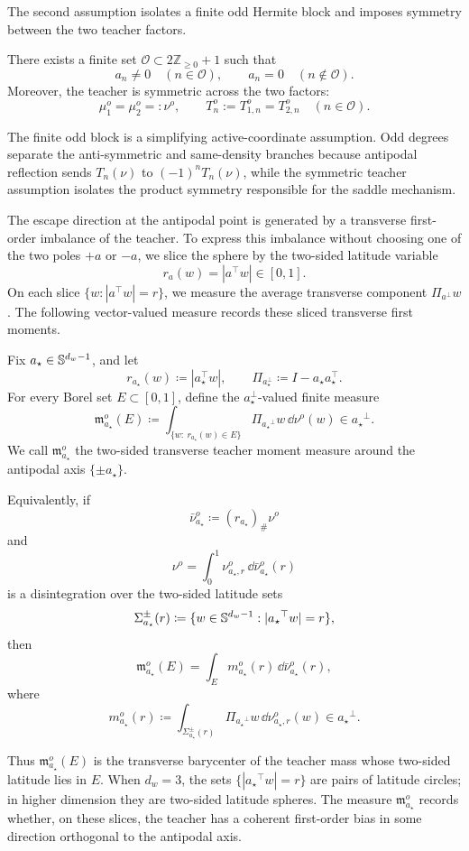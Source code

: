 The second assumption isolates a finite odd Hermite block and imposes symmetry between the two teacher factors.
\begin{assumption}
\label{assumption:odd-symmetric-teacher}
There exists a finite set \(\mathcal O\subset 2\mathbb Z_{\ge0}+1\) such that
\[
    a_n\neq0 \quad (n\in\mathcal O),
    \qquad
    a_n=0 \quad (n\notin\mathcal O).
\]
Moreover, the teacher is symmetric across the two factors:
\[
    \mu_1^o=\mu_2^o=:\nu^o,
    \qquad
    T_n^o:=T_{1,n}^o=T_{2,n}^o
    \quad(n\in\mathcal O).
\]
\end{assumption}
The finite odd block is a simplifying active-coordinate assumption.  Odd degrees
separate the anti-symmetric and same-density branches because antipodal
reflection sends \(T_n(\nu)\) to \((-1)^nT_n(\nu)\), while the symmetric teacher
assumption isolates the product symmetry responsible for the saddle mechanism.

The escape direction at the antipodal point is generated by a transverse first-order imbalance of the teacher.  To express this imbalance without
choosing one of the two poles \(+a\) or \(-a\), we slice the sphere by the
two-sided latitude variable
\[
    r_a(w)=|a^\top w|\in[0,1].
\]
On each slice \(\{w:|a^\top w|=r\}\), we measure the average transverse
component \(\Pi_{a^\perp}w\).  The following vector-valued measure records
these sliced transverse first moments.
\begin{definition}
\label{def:two-sided-transverse-teacher-moment-measure}
Fix \(a_\star\in\mathbb{S}^{d_w-1}\), and let
\[
    r_{a_\star}(w)\coloneq |a_\star^\top w|,
    \qquad
    \Pi_{a_\star^\perp}\coloneq I-a_\star a_\star^\top .
\]
For every Borel set \(E\subset[0,1]\), define the \(a_\star^\perp\)-valued finite
measure
\[
    \mathfrak m_{a_\star}^o(E)
    \coloneq
    \int_{\{w:\ r_{a_\star}(w)\in E\}}
    \Pi_{{a_\star}^\perp}w
    \,\dd\nu^o(w)
    \in {a_\star}^\perp .
\]
We call \(\mathfrak m_{a_\star}^o\) the two-sided transverse teacher moment measure
around the antipodal axis \(\{\pm {a_\star}\}\).

Equivalently, if
\[
    \bar\nu_{a_\star}^o\coloneq (r_{a_\star})_\#\nu^o
\]
and
\[
    \nu^o=\int_0^1\nu_{{a_\star},r}^o\,\dd\bar\nu_{a_\star}^o(r)
\]
is a disintegration over the two-sided latitude sets
\[
    \Sigma_{a_\star}^\pm(r)
    \coloneq
    \{w\in\mathbb{S}^{d_w-1}: |{a_\star}^\top w|=r\},
\]
then
\[
    \mathfrak m_{a_\star}^o(E)
    =
    \int_E m_{a_\star}^o(r)\,\dd\bar\nu_{a_\star}^o(r),
\]
where
\[
    m_{a_\star}^o(r)
    \coloneq
    \int_{\Sigma_{a_\star}^\pm(r)}
    \Pi_{{a_\star}^\perp}w\,\dd\nu_{{a_\star},r}^o(w)
    \in {a_\star}^\perp .
\]
\end{definition}
Thus \(\mathfrak m_{a_\star}^o(E)\) is the transverse barycenter of the teacher mass whose two-sided latitude lies in \(E\).  When \(d_w=3\), the sets
\(\{|{a_\star}^\top w|=r\}\) are pairs of latitude circles; in higher dimension they are two-sided latitude spheres.  The measure \(\mathfrak m_{a_\star}^o\) records whether, on these slices, the teacher has a coherent first-order bias in some direction
orthogonal to the antipodal axis.

